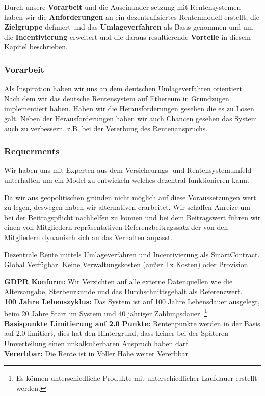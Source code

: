 Durch unsere \textbf{Vorarbeit} und die Auseinander setzung mit Rentensystemen haben wir die \textbf{Anforderungen} an ein dezentralisiertes Rentenmodell erstellt, die  \textbf{Zielgruppe} definiert und das \textbf{Umlageverfahren} als Basis genommen und um die \textbf{Incentivierung} erweitert und die daraus resultierende \textbf{Vorteile} in diesem Kapitel beschrieben.

\subsubsection*{Vorarbeit}

Als Inspiration haben wir uns an dem deutschen Umlageverfahren orientiert. Nach dem wir das deutsche Rentensystem auf Ethereum in Grundzügen implementiert haben. Haben wir die Herausforderungen gesehen die es zu Lösen galt.
Neben der Herausforderungen haben wir auch Chancen gesehen das System auch zu verbessern. z.B. bei der Vererbung des Rentenanspruchs.


\subsubsection*{Requerments}

Wir haben uns mit Experten aus dem Versicheurngs- und Rentensystemumfeld unterhalten um ein Model zu entwickeln welches dezentral funktionieren kann.

Da wir aus geopolitischen gründen nicht möglich auf diese Voraussetzungen wert zu legen, deswegen haben wir alternativen erarbeitet.
Wir schaffen Anreize um bei der Beitragspflicht nachhelfen zu können und bei dem Beitragswert führen wir einen von Mitgliedern repräsentativen Referenzbeitragssatz der von den Mitgliedern dynamisch sich an das Verhalten anpasst.

Dezentrale Rente mittels Umlageverfahren und Incentivierung als SmartContract.
Global Verfügbar. Keine Verwaltungskosten (außer Tx Kosten) oder Provision

\textbf{GDPR Konform:} Wir Verzichten auf alle externe Datenquellen wie die Altersangabe, Sterbeurkunde und das Durchschnittsgehalt als Referenzwert.\\
\textbf{100 Jahre Lebenszyklus:} Das System ist auf 100 Jahre Lebensdauer ausgelegt, beim 20 Jahre Start im System und 40 jähriger Zahlungsdauer. \footnote{ Es können unterschiedliche Produkte mit unterschiedlicher Laufdauer erstellt werden.} \\
\textbf{Basispunkte Limitierung auf 2.0 Punkte:} Rentenpunkte werden in der Basis auf 2.0 limitiert, dies hat den Hintergrund, dass keiner bei der Späteren Umverteilung einen unkalkulierbaren Anspruch haben darf.\\
\textbf{Vererbbar:} Die Rente ist in Voller Höhe weiter Vererbbar


